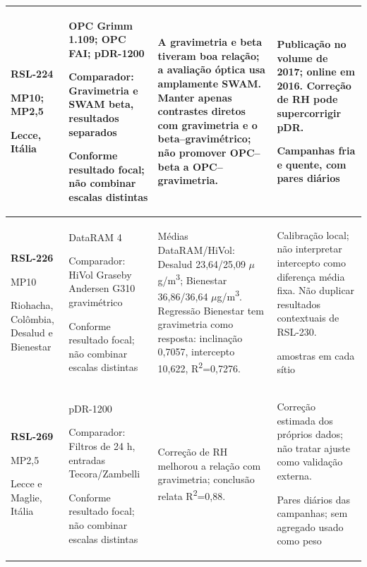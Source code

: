 \begin{longtable}{|P{0.18\textwidth}|P{0.25\textwidth}|P{0.28\textwidth}|P{\arrayrulewidth\relax}|}
\textbf{RSL-224}\par\textcite{rsl224}\par MP10; MP2,5\par Lecce, Itália & OPC Grimm 1.109; OPC FAI; pDR-1200\par\medskip Comparador: Gravimetria e SWAM beta, resultados separados\par\medskip Conforme resultado focal; não combinar escalas distintas & A gravimetria e beta tiveram boa relação; a avaliação óptica usa amplamente SWAM. Manter apenas contrastes diretos com gravimetria e o beta--gravimétrico; não promover OPC--beta a OPC--gravimetria. & Publicação no volume de 2017; online em 2016. Correção de RH pode supercorrigir pDR.\par\medskip Campanhas fria e quente, com pares diários\\\hline
\textbf{RSL-226}\par\textcite{rsl226}\par MP10\par Riohacha, Colômbia, Desalud e Bienestar & DataRAM 4\par\medskip Comparador: HiVol Graseby Andersen G310 gravimétrico\par\medskip Conforme resultado focal; não combinar escalas distintas & Médias DataRAM/HiVol: Desalud 23,64/25,09 \ensuremath{\mu}g/m\textsuperscript{3}; Bienestar 36,86/36,64 \ensuremath{\mu}g/m\textsuperscript{3}. Regressão Bienestar tem gravimetria como resposta: inclinação 0,7057, intercepto 10,622, R\textsuperscript{2}=0,7276. & Calibração local; não interpretar intercepto como diferença média fixa. Não duplicar resultados contextuais de RSL-230.\par{} amostras em cada sítio\\\hline
\textbf{RSL-269}\par\textcite{rsl269}\par MP2,5\par Lecce e Maglie, Itália & pDR-1200\par\medskip Comparador: Filtros de 24 h, entradas Tecora/Zambelli\par\medskip Conforme resultado focal; não combinar escalas distintas & Correção de RH melhorou a relação com gravimetria; conclusão relata R\textsuperscript{2}=0,88. & Correção estimada dos próprios dados; não tratar ajuste como validação externa.\par\medskip Pares diários das campanhas; sem agregado usado como peso\\\hline

\end{longtable}
